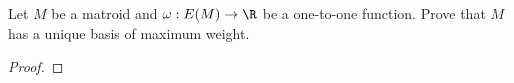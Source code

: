 \prob
{
    Let $M$ be a matroid and $\omega: E(M) \rightarrow \R$ be a one-to-one function. 
    Prove that $M$ has a unique basis of maximum weight.
}
\begin{proof}
\end{proof}
